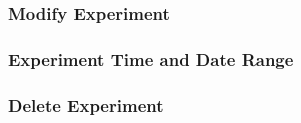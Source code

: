 \subsubsection{Modify Experiment}


\subsubsection{Experiment Time and Date Range}


\subsubsection{Delete Experiment}
